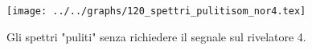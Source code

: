 \begin{figure}[h] \centering\texttt{[image: ../../graphs/120\_spettri\_pulitisom\_nor4.tex]}\caption{Gli spettri "puliti" senza richiedere il segnale sul rivelatore 4. }\label{gr:120_spettri_pulitisom_nor4} \end{figure}
